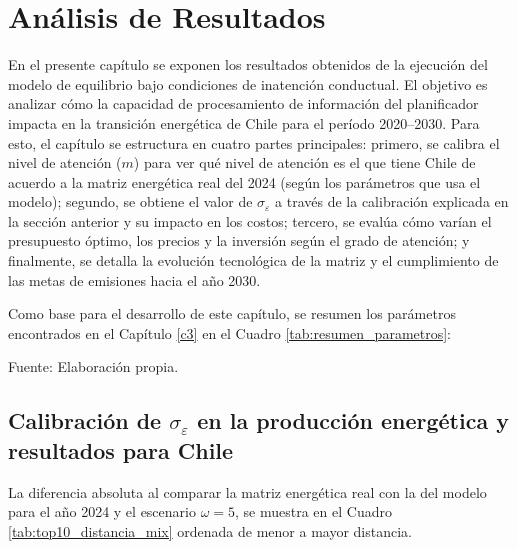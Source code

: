 
\chapter{Análisis de Resultados}
\label{c4} %
En el presente capítulo se exponen los resultados obtenidos de la ejecución del modelo de equilibrio bajo condiciones de inatención conductual. El objetivo es analizar cómo la capacidad de procesamiento de información del planificador impacta en la transición energética de Chile para el período 2020--2030. Para esto, el capítulo se estructura en cuatro partes principales: primero, se calibra el nivel de atención ($m$) para ver qué nivel de atención es el que tiene Chile de acuerdo a la matriz energética real del 2024 (según los parámetros que usa el modelo); segundo, se obtiene el valor de  $\sigma_{\varepsilon}$ a través de la calibración explicada en la sección anterior y su impacto en los costos; tercero, se evalúa cómo varían el presupuesto óptimo, los precios y la inversión según el grado de atención; y finalmente, se detalla la evolución tecnológica de la matriz y el cumplimiento de las metas de emisiones hacia el año 2030.

Como base para el desarrollo de este capítulo, se resumen los parámetros encontrados en el Capítulo \ref{c3} en el Cuadro \ref{tab:resumen_parametros}:
\begin{table}[H]
\centering
\caption{Resumen de parámetros base para la simulación}
\label{tab:resumen_parametros}
\renewcommand{\arraystretch}{1.2}
\setlength{\tabcolsep}{10pt}
\tablaParametrosChile{}

\footnotesize{Fuente: Elaboración propia.}
\end{table}

\section{\boldmath Calibración de $\sigma_\varepsilon$ en la producción energética y resultados para Chile}
La diferencia absoluta al comparar la matriz energética real con la del modelo para el año 2024 y el escenario $\omega=5$, se muestra en el Cuadro \ref{tab:top10_distancia_mix} ordenada de menor a mayor distancia. 

